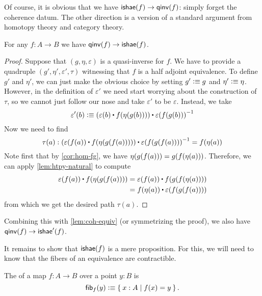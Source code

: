 Of course, it is obvious that we have $\mathsf{ishae}(f) \to\mathsf{qinv}(f)$: simply forget the coherence datum.
The other direction is a version of a standard argument from homotopy theory and category theory.

\begin{thm}\label{thm:equiv-iso-adj}
  For any $f:A\to B$ we have $\mathsf{qinv}(f)\to\mathsf{ishae}(f)$.
\end{thm}
\begin{proof}
Suppose that $(g,\eta,\varepsilon)$ is a quasi-inverse for $f$. We have to provide
a quadruple $(g',\eta',\varepsilon',\tau)$ witnessing that $f$ is a half adjoint equivalence. To
define $g'$ and $\eta'$, we can just make the obvious choice by setting $g'
\vcentcolon\equiv g$ and $\eta'\vcentcolon\equiv \eta$. However, in the definition of $\varepsilon'$ we
need start worrying about the construction of $\tau$, so we cannot just follow our nose
and take $\varepsilon'$ to be $\varepsilon$. Instead, we take
\begin{equation*}
\varepsilon'(b) \defeq (\varepsilon(b)\ct \ap{f}{\eta(g(b))})\ct \opp{\varepsilon(f(g(b)))}
\end{equation*}
Now we need to find
\begin{equation*}
\tau(a):(\varepsilon(f(a))\ct \ap{f}{\eta(g(f(a)))})\ct \opp{\varepsilon(f(g(f(a))))}=\ap{f}{\eta(a)}
\end{equation*}
Note first that by \autoref{cor:hom-fg}, we have 
$\eta(g(f(a)))={g}\mathopen{}\left({{f}\mathopen{}\left({\eta(a)}\right)\mathclose{}}\right)\mathclose{}$. Therefore, we can apply
\autoref{lem:htpy-natural} to compute
\begin{align*}
\varepsilon(f(a))\ct \ap{f}{\eta(g(f(a)))}
& = \varepsilon(f(a))\ct \ap{f}{\ap{g}{\ap{f}{\eta(a)}}}\\
& = \ap{f}{\eta(a)}\ct\varepsilon(f(g(f(a))))
\end{align*}
from which we get the desired path $\tau(a)$.
\end{proof}

Combining this with \autoref{lem:coh-equiv} (or symmetrizing the proof), we also have $\mathsf{qinv}(f)\to\mathsf{ishae}'(f)$.

It remains to show that $\mathsf{ishae}(f)$ is a mere proposition.
For this, we will need to know that the fibers of an equivalence are contractible.

\begin{defn}\label{defn:homotopy-fiber}
  The  of a map $f:A\to B$ over a point $y:B$ is
  \[ {\mathsf{fib}}_{f}(y) \vcentcolon\equiv \Set{x:A | f(x) = y}.\]
\end{defn}

